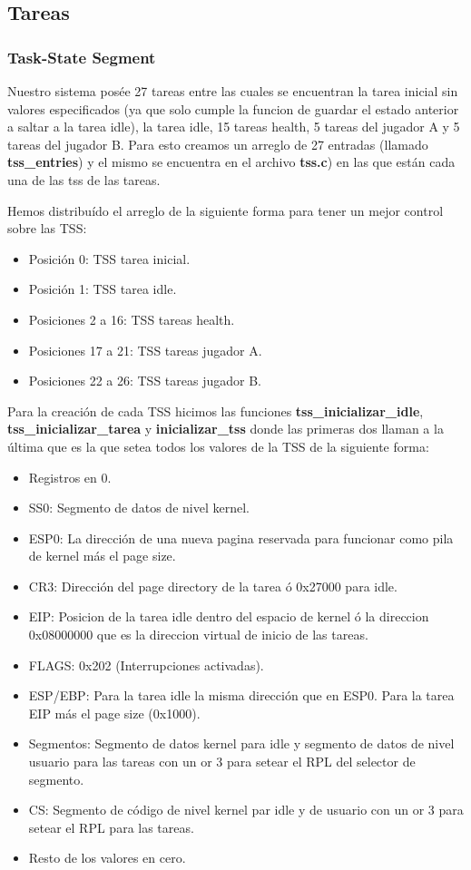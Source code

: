 \subsection{Tareas}

\subsubsection{Task-State Segment}

Nuestro sistema posée 27 tareas entre las cuales se encuentran la tarea inicial sin valores especificados (ya que solo cumple la funcion de guardar el estado anterior a saltar a la tarea idle), la tarea idle, 15 tareas health, 5 tareas del jugador A y 5 tareas del jugador B. Para esto creamos un arreglo de 27 entradas (llamado \textbf{tss_entries}) y el mismo se encuentra en el archivo \textbf{tss.c}) en las que están cada una de las tss de las tareas.

Hemos distribuído el arreglo de la siguiente forma para tener un mejor control sobre las TSS:

\begin{itemize}
	\item Posición 0: TSS tarea inicial.
	\item Posición 1: TSS tarea idle.
	\item Posiciones 2 a 16: TSS tareas health.
	\item Posiciones 17 a 21: TSS tareas jugador A.
	\item Posiciones 22 a 26: TSS tareas jugador B.
\end{itemize}

Para la creación de cada TSS hicimos las funciones \textbf{tss_inicializar_idle}, \textbf{tss_inicializar_tarea} y \textbf{inicializar_tss} donde las primeras dos llaman a la última que es la que setea todos los valores de la TSS de la siguiente forma:

\begin{itemize}
	\item Registros en 0.
	\item SS0: Segmento de datos de nivel kernel.
	\item ESP0: La dirección de una nueva pagina reservada para funcionar como pila de kernel más el page size.
	\item CR3: Dirección del page directory de la tarea ó 0x27000 para idle.
	\item EIP: Posicion de la tarea idle dentro del espacio de kernel ó la direccion 0x08000000 que es la direccion virtual de inicio de las tareas.
	\item FLAGS: 0x202 (Interrupciones activadas).
	\item ESP/EBP: Para la tarea idle la misma dirección que en ESP0. Para la tarea EIP más el page size (0x1000).
	\item Segmentos: Segmento de datos kernel para idle y segmento de datos de nivel usuario para las tareas con un or 3 para setear el RPL del selector de segmento.
	\item CS: Segmento de código de nivel kernel par idle y de usuario con un or 3 para setear el RPL para las tareas.
	\item Resto de los valores en cero.
\end{itemize}

